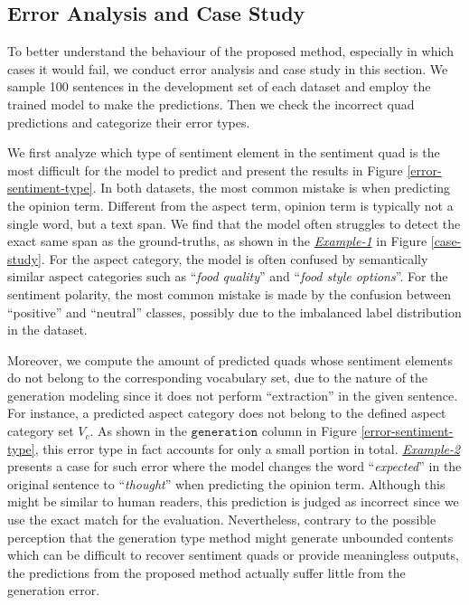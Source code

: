 \documentclass[11pt]{article}
\begin{document}
\subsection{Error Analysis and Case Study}
To better understand the behaviour of the proposed method, especially in which cases it would fail,
we conduct error analysis and case study in this section. We sample 100 sentences in the development set of each dataset and employ the trained model to make the predictions. Then we check the incorrect quad predictions and categorize their error types.

We first analyze which type of sentiment element in the sentiment quad is the most difficult for the model to predict and present the results in Figure \ref{error-sentiment-type}. In both datasets, the most common mistake is when predicting the opinion term. Different from the aspect term, opinion term is typically not a single word, but a text span. We find that the model often struggles to detect the exact same span as the ground-truths, as shown in the \underline{\textit{Example-1}} in Figure \ref{case-study}.
For the aspect category, the model is often confused by semantically similar aspect categories such as ``\textit{food quality}'' and ``\textit{food style options}''.
For the sentiment polarity, the most common mistake is made by the confusion between ``positive'' and ``neutral'' classes, possibly due to the imbalanced label distribution in the dataset.

Moreover, we compute the amount of predicted quads whose sentiment elements do not belong to the corresponding vocabulary set, due to the nature of the generation modeling since it does not perform ``extraction'' in the given sentence. For instance, a predicted aspect category does not belong to the defined aspect category set $V_c$. 
As shown in the $\mathtt{generation}$ column in Figure \ref{error-sentiment-type}, this error type in fact accounts for only a small portion in total. \underline{\textit{Example-2}} presents a case for such error where the model changes the word ``\textit{expected}'' in the original sentence to ``\textit{thought}'' when predicting the opinion term. Although this might be similar to human readers, this prediction is judged as incorrect since we use the exact match for the evaluation.
Nevertheless, contrary to the possible perception that the generation type method might generate unbounded contents which can be difficult to recover sentiment quads or provide meaningless outputs, the predictions from the proposed method actually suffer little from the generation error.
\end{document}
